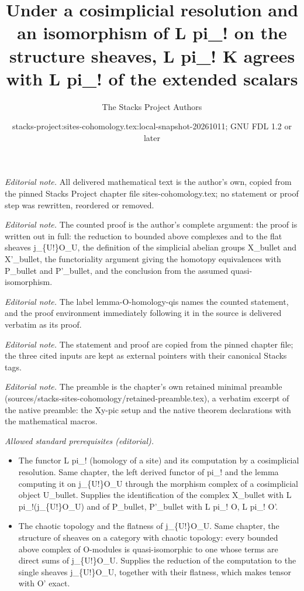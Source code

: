 \documentclass[10pt,a4paper]{amsart}
\title{Under a cosimplicial resolution and an isomorphism of L pi\_! on the structure sheaves, L pi\_! K agrees with L pi\_! of the extended scalars}
\author{The Stacks Project Authors}
\date{stacks-project:sites-cohomology.tex:local-snapshot-20261011; GNU FDL 1.2 or later}
\theoremstyle{plain}
\theoremstyle{definition}
\theoremstyle{remark}
\numberwithin{equation}{subsection}
\begin{document}
\maketitle
\noindent\textit{Editorial note.} All delivered mathematical text is the author's own, copied from the pinned Stacks Project chapter file sites-cohomology.tex; no statement or proof step was rewritten, reordered or removed.\par\medskip
\noindent\textit{Editorial note.} The counted proof is the author's complete argument: the proof is written out in full: the reduction to bounded above complexes and to the flat sheaves j\_\{U!\}O\_U, the definition of the simplicial abelian groups X\_bullet and X'\_bullet, the functoriality argument giving the homotopy equivalences with P\_bullet and P'\_bullet, and the conclusion from the assumed quasi-isomorphism.\par\medskip
\noindent\textit{Editorial note.} The label lemma-O-homology-qis names the counted statement, and the proof environment immediately following it in the source is delivered verbatim as its proof.\par\medskip
\noindent\textit{Editorial note.} The statement and proof are copied from the pinned chapter file; the three cited inputs are kept as external pointers with their canonical Stacks tags.\par\medskip
\noindent\textit{Editorial note.} The preamble is the chapter's own retained minimal preamble (sources/stacks-sites-cohomology/retained-preamble.tex), a verbatim excerpt of the native preamble: the Xy-pic setup and the native theorem declarations with the mathematical macros.\par\medskip
\noindent\textit{Allowed standard prerequisites (editorial).}\begin{itemize}
\item The functor L pi\_! (homology of a site) and its computation by a cosimplicial resolution. Same chapter, the left derived functor of pi\_! and the lemma computing it on j\_\{U!\}O\_U through the morphism complex of a cosimplicial object U\_bullet. Supplies the identification of the complex X\_bullet with L pi\_!(j\_\{U!\}O\_U) and of P\_bullet, P'\_bullet with L pi\_! O, L pi\_! O'.
\item The chaotic topology and the flatness of j\_\{U!\}O\_U. Same chapter, the structure of sheaves on a category with chaotic topology: every bounded above complex of O-modules is quasi-isomorphic to one whose terms are direct sums of j\_\{U!\}O\_U. Supplies the reduction of the computation to the single sheaves j\_\{U!\}O\_U, together with their flatness, which makes tensor with O' exact.
\end{itemize}\medskip
\end{document}
